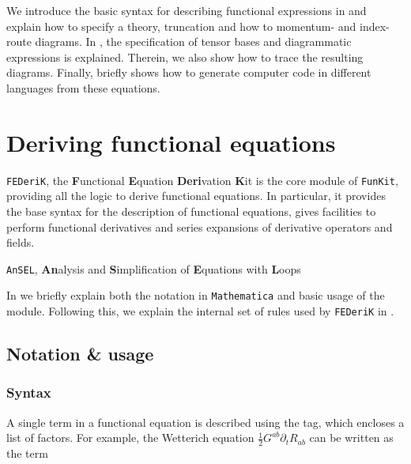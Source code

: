 \documentclass[10pt,prd,nofootinbib,superscriptaddress,twocolumn]{revtex4-2}
\newcommand{\mathem}{\mmaInlineCell{Code}}
\newcommand{\FunKit}{\texttt{FunKit}\xspace}
\newcommand{\FEDeriK}{\texttt{FEDeriK}\xspace}
\newcommand{\AnSEL}{\texttt{AnSEL}\xspace}
\begin{document}
We introduce the basic syntax for describing functional expressions in  and explain how to specify a theory, truncation and how to momentum- and index-route diagrams.
In , the specification of tensor bases and diagrammatic expressions is explained. Therein, we also show how to trace the resulting diagrams.
Finally,  briefly shows how to generate computer code in different languages from these equations.


\section{Deriving functional equations}
\label{sec:FEDeriK}

\FEDeriK, the {\textbf{F}unctional \textbf{E}quation \textbf{Deri}vation \textbf{K}it} is the core module of \FunKit, providing all the logic to derive functional equations. In particular, it provides the base syntax for the description of functional equations, gives facilities to perform functional derivatives and series expansions of derivative operators and fields.


\AnSEL, \textbf{An}alysis and \textbf{S}implification of \textbf{E}quations with \textbf{L}oops

In  we briefly explain both the notation in \texttt{Mathematica} and basic usage of the module. Following this, we explain the internal set of rules used by \FEDeriK in .


\subsection{Notation \& usage}
\label{sec:FEDeriK_notation}

\subsubsection{Syntax}

A single term in a functional equation is described using the \mathem{\mmaDef{FTerm}} tag, which encloses a list of factors. For example, the Wetterich equation $\frac{1}{2}G^{ab}\partial_tR_{ab}$ can be written as the term
%
\end{document}
